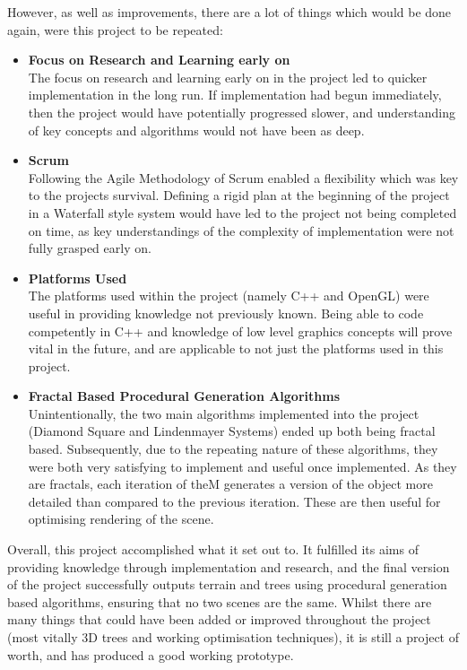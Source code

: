 \documentclass[a4paper,10pt]{report}
\begin{document}
However, as well as improvements, there are a lot of things which would be done again, were this project to be repeated: 
\begin{itemize}
    \item \textbf{Focus on Research and Learning early on} \\
    The focus on research and learning early on in the project led to quicker implementation in the long run. If implementation had begun immediately, then the project would have potentially progressed slower, and understanding of key concepts and algorithms would not have been as deep.
    \item \textbf{Scrum} \\
    Following the Agile Methodology of Scrum enabled a flexibility which was key to the projects survival. Defining a rigid plan at the beginning of the project in a Waterfall style system would have led to the project not being completed on time, as key understandings of the complexity of implementation were not fully grasped early on.
    \item \textbf{Platforms Used} \\
    The platforms used within the project (namely C++ and OpenGL) were useful in providing knowledge not previously known. Being able to code competently in C++ and knowledge of low level graphics concepts will prove vital in the future, and are applicable to not just the platforms used in this project. \\
    \item \textbf{Fractal Based Procedural Generation Algorithms} \\
    Unintentionally, the two main algorithms implemented into the project (Diamond Square and Lindenmayer Systems) ended up both being fractal based. Subsequently, due to the repeating nature of these algorithms, they were both very satisfying to implement and useful once implemented. As they are fractals, each iteration of theM generates a version of the object more detailed than compared to the previous iteration. These are then useful for optimising rendering of the scene. 
\end{itemize}

Overall, this project accomplished what it set out to. It fulfilled its aims of providing knowledge through implementation and research, and the final version of the project successfully outputs terrain and trees using procedural generation based algorithms, ensuring that no two scenes are the same. Whilst there are many things that could have been added or improved throughout the project (most vitally 3D trees and working optimisation techniques), it is still a project of worth, and has produced a good working prototype.
\clearpage
\end{document}
